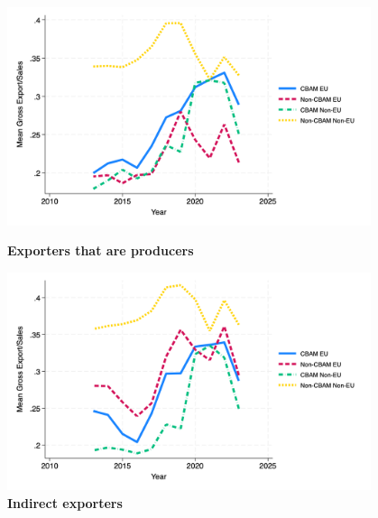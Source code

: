 \documentclass{article}
\begin{document}
\begin{figure}[H]
\centering
\includegraphics[width=0.95\textwidth]{gross_ep.png}
\caption{\textbf{Exporters that are producers}}
\includegraphics[width=0.95\textwidth]{gross_in.png}
\caption{\textbf{Indirect exporters}}
\end{figure}
\end{document}
